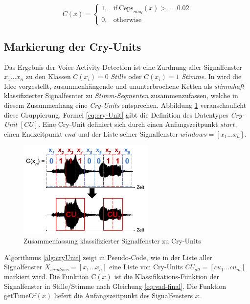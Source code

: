 \begin{equation}
C(x)=
\begin{cases}
1, & \text{if}\ \text{Ceps}_{mag}(x) >= 0.02 \\
0, & \text{otherwise}
\end{cases}
\label{eq:vad-final}
\end{equation}

\subsection{Markierung der Cry-Units}
\label{sec:CryUnit}

Das Ergebnis der Voice-Activity-Detection ist eine Zurdnung aller Signalfenster $x_1 ... x_n$ zu den Klassen $C(x_i) = 0$ \emph{Stille} oder  $C(x_i) = 1$ \emph{Stimme}. In \cite{vad_entropy} wird die Idee vorgestellt, zusammenhängende und ununterbrochene Ketten als \emph{stimmhaft} klassifizierter Signalfesnter zu \emph{Stimm-Segmenten} zusammenzufassen, welche in diesem Zusammenhang eine \emph{Cry-Units} entsprechen. Abbildung \ref{img:cryUnit} veranschaulicht diese Gruppierung. Formel \ref{eq:cry-Unit} gibt die Definition des Datentypes \emph{Cry-Unit} $[CU]$. Eine Cry-Unit definiert sich durch einen Anfangszeitpunkt $start$, einen Endzeitpunkt $end$ und der Liste seiner Signalfenster $windows = [x_1 ... x_n]$.

\begin{figure}[h]
	\centering
	\includegraphics[width=0.6\textwidth]{bilder/cry-Unit01.png}
	\caption{Zusammenfassung klassifizierter Signalfenster zu Cry-Units}
	\label{img:cryUnit}
\end{figure}

Algorithmus \ref{alg:cryUnit} zeigt in Pseudo-Code, wie in der Liste aller Signalfenster $X_{windows} = [x_1 ... x_n]$ eine Liste von Cry-Units $CU_{all} = [cu_1 ... cu_m]$ markiert wird. Die Funktion C$(x)$ ist die Klassifikations-Funktion der Signalfenster in Stille/Stimme nach Gleichung \ref{eq:vad-final}. Die Funktion getTimeOf$(x)$ liefert die Anfangszeitpunkt des Signalfensters $x$.

